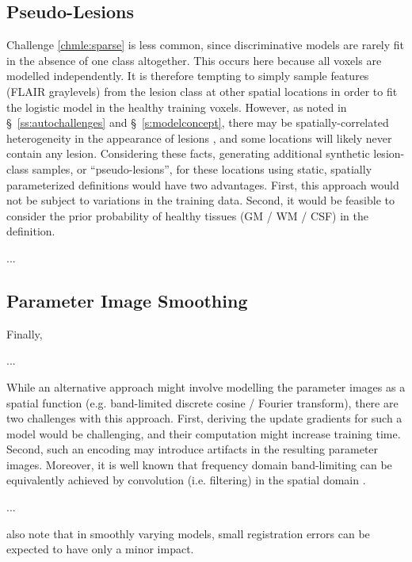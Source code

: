 \subsection{Pseudo-Lesions}
Challenge \ref{chmle:sparse} is less common, since discriminative models are rarely fit in the absence of one class altogether. This occurs here because all voxels are modelled independently. It is therefore tempting to simply sample features (FLAIR graylevels) from the lesion class at other spatial locations in order to fit the logistic model in the healthy training voxels. However, as noted in \S\ \ref{ss:autochallenges} and \S\ \ref{s:modelconcept}, there may be spatially-correlated heterogeneity in the appearance of lesions \cite{Sled2004,Stevenson2000}, and some locations will likely never contain any lesion. Considering these facts, generating additional synthetic lesion-class samples, or ``pseudo-lesions'', for these locations using static, spatially parameterized definitions would have two advantages. First, this approach would not be subject to variations in the training data. Second, it would be feasible to consider the prior probability of healthy tissues (GM / WM / CSF) in the definition.
\par...\par
\subsection{Parameter Image Smoothing}
Finally, 
\par...\par
While an alternative approach might involve modelling the parameter images as a spatial function (e.g. band-limited discrete cosine / Fourier transform), there are two challenges with this approach.
First, deriving the update gradients for such a model would be challenging, and their computation might increase training time.
Second, such an encoding may introduce artifacts in the resulting parameter images.
Moreover, it is well known that frequency domain band-limiting can be equivalently achieved by convolution (i.e. filtering) in the spatial domain \cite{Gonzalez2006}.
\par...\par
\citeauthor{Harmouche2015} also note that in smoothly varying models, small registration errors can be expected to have only a minor impact.
